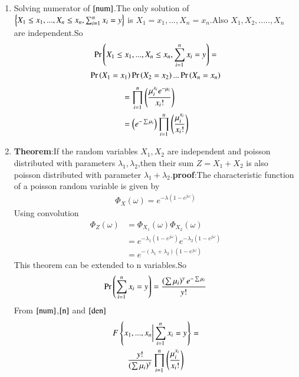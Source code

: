 \documentclass[journal,12pt,twocolumn]{IEEEtran}
\begin{document}
\begin{enumerate}
\item Solving numerator of $\eqref{num}$.The only solution of ${\left\{X_1\leq x_1,...,X_n\leq x_n,\sum_{i=1}^{n}x_i=y\right\}}$ is $X_1=x_1,...,X_n=x_n$.Also $X_1,X_2,.....,X_n$ are independent.So 
    \begin{multline}
        \Pr\left(X_1\leq x_1,...,X_n\leq x_n,\sum_{i=1}^{n}x_i=y\right)=\\
        \Pr\left(X_1=x_1\right)\Pr\left(X_2=x_2\right)...\Pr\left(X_n=x_n\right)
    \end{multline}
\begin{align}
    &=\prod_{i=1}^n\left(\frac{\mu_i^{x_i}e^{-\mu_i}}{x_i!}\right)\\
    &=\left(e^{-\sum\mu_i}\right)\prod_{i=1}^n\left(\frac{\mu_i^{x_i}}{x_i!}\right)\label{n}
\end{align}
\item \textbf{Theorem}:If the random variables $X_1,X_2$ are independent and poisson distributed with parameters $\lambda_1,\lambda_2$,then their sum $Z=X_1+X_2$ is also poisson distributed with parameter $\lambda_1+\lambda_2$.\textbf{proof}:The characteristic function of a poisson random variable is given by
\begin{align}
    \Phi_X(\omega)=e^{-\lambda(1-e^{j\omega})}
\end{align}
Using convolution 
\begin{align}
    \Phi_Z(\omega)&=\Phi_{X_1}(\omega)\Phi_{X_2}(\omega)\\
    &=e^{-\lambda_1(1-e^{j\omega})}e^{-\lambda_2(1-e^{j\omega})}\\
    &=e^{-(\lambda_1+\lambda_2)(1-e^{j\omega})}
\end{align}
This theorem can be extended to n variables.So
\begin{align}
    \Pr\left(\sum_{i=1}^{n}x_i=y\right)=\frac{\left(\sum\mu_i\right)^ye^{-\sum\mu_i}}{y!}\label{den}
\end{align}
From $\eqref{num}$,$\eqref{n}$ and $\eqref{den}$ 
\begin{multline}
     F\left\{x_1,...,x_n\biggr\vert\sum_{i=1}^{n}x_i=y\right\}=\\
     \frac{y!}{\left(\sum\mu_i\right)^y}\prod_{i=1}^n\left(\frac{\mu_i^{x_i}}{x_i!}\right)
\end{multline}
\end{enumerate}
\end{document}
